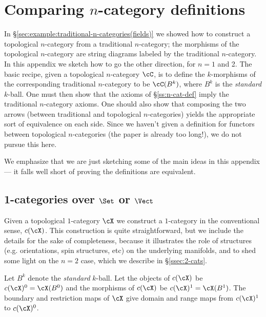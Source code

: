 
\section{Comparing \texorpdfstring{$n$}{n}-category definitions}
\label{sec:comparing-defs}

In \S\ref{sec:example:traditional-n-categories(fields)} we showed how to construct
a topological $n$-category from a traditional $n$-category; the morphisms of the 
topological $n$-category are string diagrams labeled by the traditional $n$-category.
In this appendix we sketch how to go the other direction, for $n=1$ and 2.
The basic recipe, given a topological $n$-category $\cC$, is to define the $k$-morphisms
of the corresponding traditional $n$-category to be $\cC(B^k)$, where
$B^k$ is the {\it standard} $k$-ball.
One must then show that the axioms of \S\ref{ss:n-cat-def} imply the traditional $n$-category axioms.
One should also show that composing the two arrows (between traditional and topological $n$-categories)
yields the appropriate sort of equivalence on each side.
Since we haven't given a definition for functors between topological $n$-categories
(the paper is already too long!), we do not pursue this here.

We emphasize that we are just sketching some of the main ideas in this appendix ---
it falls well short of proving the definitions are equivalent.


\subsection{1-categories over \texorpdfstring{$\Set$ or $\Vect$}{Set or Vect}}
\label{ssec:1-cats}
Given a topological $1$-category $\cX$ we construct a $1$-category in the conventional sense, $c(\cX)$.
This construction is quite straightforward, but we include the details for the sake of completeness, 
because it illustrates the role of structures (e.g. orientations, spin structures, etc) 
on the underlying manifolds, and 
to shed some light on the $n=2$ case, which we describe in \S \ref{ssec:2-cats}.

Let $B^k$ denote the \emph{standard} $k$-ball.
Let the objects of $c(\cX)$ be $c(\cX)^0 = \cX(B^0)$ and the morphisms of $c(\cX)$ be $c(\cX)^1 = \cX(B^1)$.
The boundary and restriction maps of $\cX$ give domain and range maps from $c(\cX)^1$ to $c(\cX)^0$.

